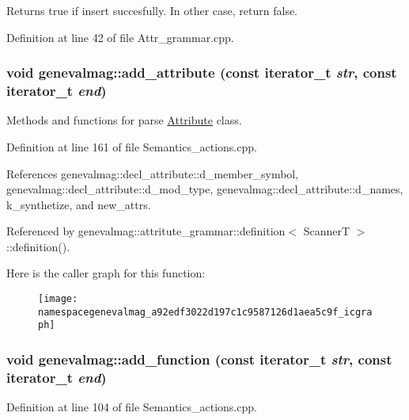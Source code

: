 Returns true if insert succesfully. In other case, return false. 

Definition at line 42 of file Attr\_\-grammar.cpp.

\hypertarget{namespacegenevalmag_a92edf3022d197c1c9587126d1aea5c9f}{
\subsubsection[{add\_\-attribute}]{\setlength{\rightskip}{0pt plus 5cm}void genevalmag::add\_\-attribute (const iterator\_\-t {\em str}, \/  const iterator\_\-t {\em end})}}
\label{namespacegenevalmag_a92edf3022d197c1c9587126d1aea5c9f}
Methods and functions for parse \hyperlink{classgenevalmag_1_1Attribute}{Attribute} class. 

Definition at line 161 of file Semantics\_\-actions.cpp.



References genevalmag::decl\_\-attribute::d\_\-member\_\-symbol, genevalmag::decl\_\-attribute::d\_\-mod\_\-type, genevalmag::decl\_\-attribute::d\_\-names, k\_\-synthetize, and new\_\-attrs.



Referenced by genevalmag::attritute\_\-grammar::definition$<$ ScannerT $>$::definition().



Here is the caller graph for this function:\nopagebreak
\begin{figure}[H]
\begin{center}
\leavevmode
\texttt{[image: namespacegenevalmag\_a92edf3022d197c1c9587126d1aea5c9f\_icgraph]}
\end{center}
\end{figure}


\hypertarget{namespacegenevalmag_aff5e0f0cff477c34b63116d99dfbe9b0}{
\subsubsection[{add\_\-function}]{\setlength{\rightskip}{0pt plus 5cm}void genevalmag::add\_\-function (const iterator\_\-t {\em str}, \/  const iterator\_\-t {\em end})}}
\label{namespacegenevalmag_aff5e0f0cff477c34b63116d99dfbe9b0}


Definition at line 104 of file Semantics\_\-actions.cpp.




